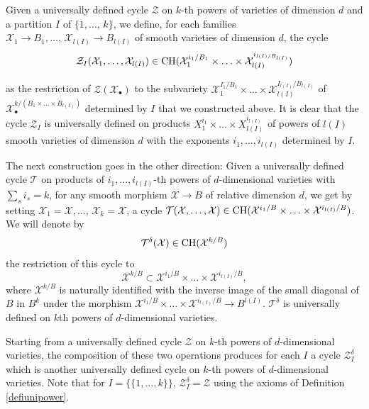 \documentclass[10pt]{article}
\begin{document}
 Given a universally defined cycle $\mathcal{Z}$ on $k$-th powers of varieties of dimension $d$ and a partition $I$ of
$\{1,\ldots,\,k\}$,  we  define, for each families
$\mathcal{X}_1\rightarrow B_1,\ldots, \,\mathcal{X}_{l(I)}\rightarrow B_{l(I)}$ of smooth varieties of dimension $d$, the cycle
\begin{eqnarray}\label{eqZJ} \mathcal{Z}_I(\mathcal{X}_1, \ldots, \mathcal{X}_{l(I)})\in{\rm CH}(\mathcal{X}_1^{i_1/B_1}\times \ldots\times \mathcal{X}_{l(I)}^{i_{l(I)/B_{l(I)}}})
\end{eqnarray}

as the restriction of $\mathcal{Z}(\mathcal{X}_\bullet)$ to the subvariety   $\mathcal{X}_1^{I_1/B_1}\times\ldots\times \mathcal{X}_{l(I)}^{I_{l(I)}/B_{l(I)}}$  of  $\mathcal{X}_\bullet^{k/(B_1\times\ldots\times B_{l(I)})}$ determined  by $I$ that we constructed above.
It is clear that the cycle $\mathcal{Z}_I$ is universally defined on products
$X_1^{i_1}\times\ldots\times X_{l(I)}^{i_{l(I)}}$ of  powers of $l(I)$ smooth varieties of dimension $d$ with the exponents
$i_1,\ldots ,i_{l(I)}$  determined by
$I$.

The next construction goes in the other direction: Given a universally defined cycle $\mathcal{T}$ on  products of $i_1,\ldots, i_{l(I)}$-th powers of $d$-dimensional varieties
with $\sum_si_s=k$,  for any smooth morphism $\mathcal{X}\rightarrow B$ of relative dimension $d$, we get by setting
$\mathcal{X}_1=\mathcal{X},\ldots, \,\mathcal{X}_k=\mathcal{X}$, a cycle
$\mathcal{T}(\mathcal{X}, \ldots, \mathcal{X})\in {\rm CH}(\mathcal{X}^{i_1/B}\times \ldots \times \mathcal{X}^{i_{l(I)}/B})$.
  We will  denote  by
  \begin{eqnarray}
  \label{eqnewpourZIdelta}
  \mathcal{T}^\delta(\mathcal{X})\in {\rm CH}(\mathcal{X}^{k/B})
  \end{eqnarray}
   the restriction of
this cycle to $$\mathcal{X}^{k/B}\subset \mathcal{X}^{i_1/B}\times \ldots \times \mathcal{X}^{i_{l(I)}/B},$$  where
$\mathcal{X}^{k/B}$ is naturally identified with the inverse image of the small diagonal of $B$ in $B^k$ under the morphism
$ \mathcal{X}^{i_1/B}\times \ldots \times \mathcal{X}^{i_{l(I)}/B}\rightarrow B^{l(I)}$. $\mathcal{T}^\delta$ is universally defined on $k$th powers of $d$-dimensional varieties.

Starting from  a universally defined cycle $\mathcal{Z}$ on $k$-th powers of $d$-dimensional varieties, the composition of these two operations produces for each $I$ a
 cycle $\mathcal{Z}_I^\delta$ which  is another  universally defined cycle on $k$-th powers of $d$-dimensional varieties.
Note that for  $I=\{\{1,\ldots,k\}\}$, $\mathcal{Z}_I^\delta=\mathcal{Z}$ using the axioms of Definition \ref{defiunipower}.
\end{document}
